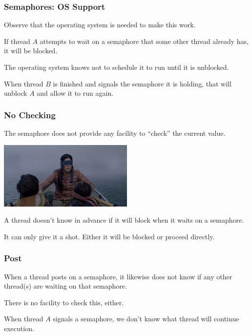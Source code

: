 \begin{frame}
	\frametitle{Semaphores: OS Support}

	Observe that the operating system is needed to make this work.

	If thread $A$ attempts to wait on a semaphore that some other thread already has, it will be blocked.

	The operating system knows not to schedule it to run until it is unblocked.

	When thread $B$ is finished and signals the semaphore it is holding, that will unblock $A$ and allow it to run again.


\end{frame}

\begin{frame}
	\frametitle{No Checking}

	The semaphore does not provide any facility to ``check'' the current value.

	\begin{center}
		\includegraphics[width=0.5\textwidth]{images/nopeeking.jpg}
	\end{center}

	A thread doesn't know in advance if it will block when it waits on a semaphore.

	It can only give it a shot. Either it will be blocked or proceed directly.

\end{frame}

\begin{frame}
	\frametitle{Post}

	When a thread posts on a semaphore, it likewise does not know if any other thread(s) are waiting on that semaphore.

	There is no facility to check this, either.

	When thread $A$ signals a semaphore, we don't know what thread will continue execution.


\end{frame}

